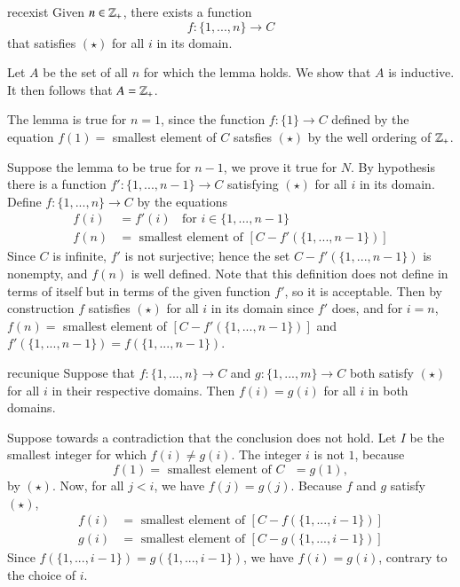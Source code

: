 \documentclass[12pt, a4paper, twoside, openright, titlepage]{book}
\begin{document}
\begin{appendices}
    \begin{lem}{}{recexist}
        Given $n \in \mathbb Z_+$, there exists a function \begin{equation*}
            f:\{1,...,n\}\rightarrow C
        \end{equation*}
        that satisfies $(\star)$ for all $i$ in its domain.
    \end{lem}
    \begin{proof*}{}{}
        Let $A$ be the set of all $n$ for which the lemma holds. We show that $A$ is inductive. It then follows that $A = \mathbb Z_+$.


        The lemma is true for $n=1$, since the function $f:\{1\}\rightarrow C$ defined by the equation $f(1) = $ smallest element of $C$ satsfies $(\star)$ by the well ordering of $\mathbb Z_+$.

        Suppose the lemma to be true for $n-1$, we prove it true for $N$. By hypothesis there is a function $f':\{1,...,n-1\}\rightarrow C$ satisfying $(\star)$ for all $i$ in its domain. Define $f:\{1,...,n\}\rightarrow C$ by the equations \begin{align*}
            f(i) &= f'(i)\;\;\text{ for } i\in\{1,...,n-1\} \\
            f(n) &= \text{ smallest element of } [C-f'(\{1,...,n-1\})]
        \end{align*}
        Since $C$ is infinite, $f'$ is not surjective; hence the set $C-f'(\{1,...,n-1\})$ is nonempty, and $f(n)$ is well defined. Note that this definition does not define in terms of itself but in terms of the given function $f'$, so it is acceptable. Then by construction $f$ satisfies $(\star)$ for all $i$ in its domain since $f'$ does, and for $i = n$, $f(n) = $ smallest element of $[C-f'(\{1,...,n-1\})]$ and $f'(\{1,...,n-1\}) = f(\{1,...,n-1\})$.
    \end{proof*}

    \begin{lem}{}{recunique}
        Suppose that $f:\{1,...,n\}\rightarrow C$ and $g:\{1,...,m\}\rightarrow C$ both satisfy $(\star)$ for all $i$ in their respective domains. Then $f(i) = g(i)$ for all $i$ in both domains.
    \end{lem}
    \begin{proof*}{}{}
        Suppose towards a contradiction that the conclusion does not hold. Let $I$ be the smallest integer for which $f(i) \neq g(i)$. The integer $i$ is not $1$, because \begin{equation*}
            f(1) = \text{ smallest element of $C$ } = g(1),
        \end{equation*}
        by $(\star)$. Now, for all $j < i$, we have $f(j) = g(j)$. Because $f$ and $g$ satisfy $(\star)$, \begin{align*}
            f(i) &= \text{ smallest element of } [C-f(\{1,...,i-1\})] \\
            g(i) &= \text{ smallest element of } [C-g(\{1,...,i-1\})]
        \end{align*}
        Since $f(\{1,...,i-1\}) = g(\{1,...,i-1\})$, we have $f(i) = g(i)$, contrary to the choice of $i$.
    \end{proof*}



\end{appendices}
\end{document}
